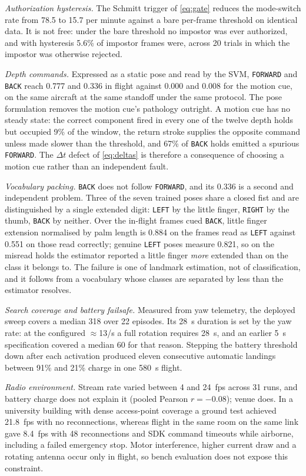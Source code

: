 \documentclass[conference]{IEEEtran}
\begin{document}
\emph{Authorization hysteresis.}
The Schmitt trigger of \eqref{eq:gate} reduces the mode-switch rate from 78.5 to
15.7 per minute against a bare per-frame threshold on identical data.
It is not free: under the bare threshold no impostor was ever authorized, and
with hysteresis 5.6\% of impostor frames were, across 20 trials in which the
impostor was otherwise rejected.

\emph{Depth commands.}
Expressed as a static pose and read by the SVM, \texttt{FORWARD} and \texttt{BACK} reach 0.777 and
0.336 in flight against 0.000 and 0.008 for the motion cue, on the same aircraft
at the same standoff under the same protocol.
The pose formulation removes the motion cue's pathology outright.
A motion cue has no steady state: the correct component fired in every one of
the twelve depth holds but occupied 9\% of the window, the return stroke
supplies the opposite command unless made slower than the threshold, and 67\% of
\texttt{BACK} holds emitted a spurious \texttt{FORWARD}.
The $\Delta t$ defect of \eqref{eq:deltas} is therefore a consequence of
choosing a motion cue rather than an independent fault.

\emph{Vocabulary packing.}
\texttt{BACK} does not follow \texttt{FORWARD}, and its 0.336 is a second and independent problem.
Three of the seven trained poses share a closed fist and are distinguished by a
single extended digit: \texttt{LEFT} by the little finger, \texttt{RIGHT} by the thumb, \texttt{BACK} by
neither.
Over the in-flight frames cued \texttt{BACK}, little finger extension normalised by palm
length is 0.884 on the frames read as \texttt{LEFT} against 0.551 on those read
correctly; genuine \texttt{LEFT} poses measure 0.821, so on the misread holds the
estimator reported a little finger \emph{more} extended than on the class it
belongs to.
The failure is one of landmark estimation, not of classification, and it follows
from a vocabulary whose classes are separated by less than the estimator
resolves.

\emph{Search coverage and battery failsafe.}
Measured from yaw telemetry, the deployed sweep covers a median 318\textdegree{}
over 22 episodes.
Its 28~s duration is set by the yaw rate: at the configured
$\approx$13\textdegree/s a full rotation requires 28~s, and an earlier 5~s
specification covered a median 60\textdegree{} for that reason.
Stepping the battery threshold down after each activation produced eleven
consecutive automatic landings between 91\% and 21\% charge in one 580~s flight.

\emph{Radio environment.}
Stream rate varied between 4 and 24~fps across 31 runs, and battery charge does
not explain it (pooled Pearson $r=-0.08$); venue does.
In a university building with dense access-point coverage a ground test achieved
21.8~fps with no reconnections, whereas flight in the same room on the same link
gave 8.4~fps with 48 reconnections and SDK command timeouts while airborne,
including a failed emergency stop.
Motor interference, higher current draw and a rotating antenna occur only in
flight, so bench evaluation does not expose this constraint.
\end{document}
